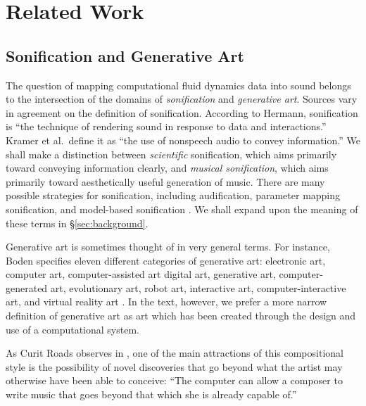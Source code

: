 \chapter[Related Work]{Related Work}
\label{chap:chap2}
\section{Sonification and Generative Art}

The question of mapping computational fluid dynamics data into sound belongs 
to the intersection of the domains of {\em sonification} and {\em generative 
art}. Sources vary in agreement on the definition of sonification. According 
to Hermann, sonification is ``the technique of rendering sound in response to 
data and interactions.'' \cite{hermann2011sonification} Kramer et al.~define 
it as ``the use of nonspeech audio to convey information.'' \cite{kramer2010sonification} 
We shall make a distinction between {\em scientific} 
sonification, which aims primarily toward conveying information clearly, and {
\em musical sonification}, which aims primarily toward aesthetically useful 
generation of music. There are many possible strategies for sonification, 
including audification, parameter mapping sonification, and model-based 
sonification \cite{hermann2011sonification}. We shall expand upon the meaning 
of these terms in \S\ref{sec:background}.

Generative art is sometimes thought of in very general terms. For instance, 
Boden specifies eleven different categories of generative art: electronic 
art, computer art, computer-assisted art digital art, generative art, computer-generated art, evolutionary art, robot art, interactive art, computer-interactive art, and virtual reality art \cite{boden2009generative}. In the 
text, however, we prefer a more narrow definition of generative art as art 
which has been created through the design and use of a computational system.

As Curit Roads observes in \cite{roads2015composing}, one of the main attractions of this compositional style is the possibility of 
novel discoveries that go beyond what the artist may otherwise have been able 
to conceive: ``The computer can allow a composer to write music that goes 
beyond that which she is already capable of.'' 

